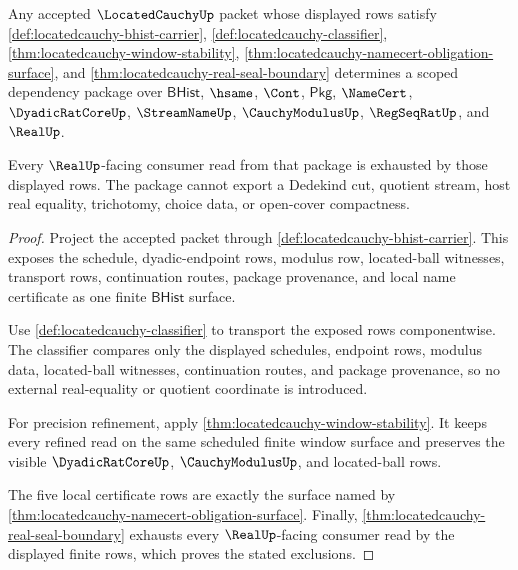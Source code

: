 \begin{theorem}
\label{thm:locatedcauchy-scoped-dependency-package}
Any accepted $\LocatedCauchyUp$ packet whose displayed rows satisfy
\autoref{def:locatedcauchy-bhist-carrier},
\autoref{def:locatedcauchy-classifier},
\autoref{thm:locatedcauchy-window-stability},
\autoref{thm:locatedcauchy-namecert-obligation-surface}, and
\autoref{thm:locatedcauchy-real-seal-boundary} determines a scoped dependency
package over $\mathsf{BHist}$, $\hsame$, $\Cont$, $\mathsf{Pkg}$,
$\NameCert$, $\DyadicRatCoreUp$, $\StreamNameUp$, $\CauchyModulusUp$,
$\RegSeqRatUp$, and $\RealUp$.

Every $\RealUp$-facing consumer read from that package is exhausted by those
displayed rows. The package cannot export a Dedekind cut, quotient stream,
host real equality, trichotomy, choice data, or open-cover compactness.
\end{theorem}
\begin{proof}
Project the accepted packet through
\autoref{def:locatedcauchy-bhist-carrier}. This exposes the schedule,
dyadic-endpoint rows, modulus row, located-ball witnesses, transport rows,
continuation routes, package provenance, and local name certificate as one
finite $\mathsf{BHist}$ surface.

Use \autoref{def:locatedcauchy-classifier} to transport the exposed rows
componentwise. The classifier compares only the displayed schedules, endpoint
rows, modulus data, located-ball witnesses, continuation routes, and package
provenance, so no external real-equality or quotient coordinate is introduced.

For precision refinement, apply
\autoref{thm:locatedcauchy-window-stability}. It keeps every refined read on
the same scheduled finite window surface and preserves the visible
$\DyadicRatCoreUp$, $\CauchyModulusUp$, and located-ball rows.

The five local certificate rows are exactly the surface named by
\autoref{thm:locatedcauchy-namecert-obligation-surface}. Finally,
\autoref{thm:locatedcauchy-real-seal-boundary} exhausts every $\RealUp$-facing
consumer read by the displayed finite rows, which proves the stated exclusions.
\end{proof}

